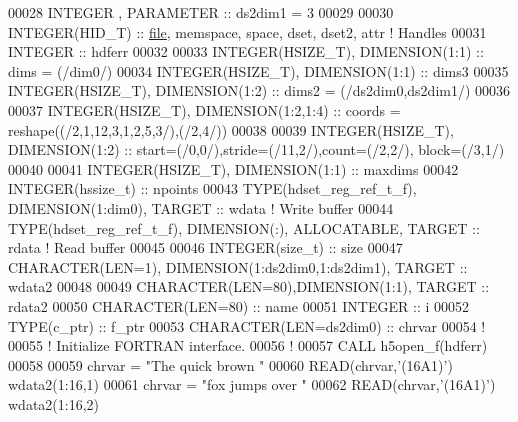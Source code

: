 \begin{DoxyCode}
00028   \textcolor{keywordtype}{INTEGER}          , \textcolor{keywordtype}{PARAMETER} :: ds2dim1   = 3
00029 
00030   \textcolor{keywordtype}{INTEGER(HID\_T)}  :: \hyperlink{structfile}{file}, memspace, space, dset, dset2, attr \textcolor{comment}{! Handles}
00031   \textcolor{keywordtype}{INTEGER} :: hdferr
00032 
00033   \textcolor{keywordtype}{INTEGER(HSIZE\_T)}, \textcolor{keywordtype}{DIMENSION(1:1)}   :: dims = (/dim0/)
00034   \textcolor{keywordtype}{INTEGER(HSIZE\_T)}, \textcolor{keywordtype}{DIMENSION(1:1)}   :: dims3 
00035   \textcolor{keywordtype}{INTEGER(HSIZE\_T)}, \textcolor{keywordtype}{DIMENSION(1:2)}   :: dims2 = (/ds2dim0,ds2dim1/)
00036 
00037   \textcolor{keywordtype}{INTEGER(HSIZE\_T)}, \textcolor{keywordtype}{DIMENSION(1:2,1:4)} :: coords = reshape((/2,1,12,3,1,2,5,3/),(/2,4/))
00038   
00039   \textcolor{keywordtype}{INTEGER(HSIZE\_T)}, \textcolor{keywordtype}{DIMENSION(1:2)} :: start=(/0,0/),stride=(/11,2/),count=(/2,2/), block=(/3,1/)
00040 
00041   \textcolor{keywordtype}{INTEGER(HSIZE\_T)}, \textcolor{keywordtype}{DIMENSION(1:1)} :: maxdims
00042   \textcolor{keywordtype}{INTEGER(hssize\_t)} :: npoints
00043   \textcolor{keywordtype}{TYPE}(hdset\_reg\_ref\_t\_f), \textcolor{keywordtype}{DIMENSION(1:dim0)}, \textcolor{keywordtype}{TARGET} :: wdata  \textcolor{comment}{! Write buffer}
00044   \textcolor{keywordtype}{TYPE}(hdset\_reg\_ref\_t\_f), \textcolor{keywordtype}{DIMENSION(:)}, \textcolor{keywordtype}{ALLOCATABLE}, \textcolor{keywordtype}{TARGET} :: rdata \textcolor{comment}{! Read buffer}
00045 
00046   \textcolor{keywordtype}{INTEGER(size\_t)} :: size
00047   \textcolor{keywordtype}{CHARACTER(LEN=1)}, \textcolor{keywordtype}{DIMENSION(1:ds2dim0,1:ds2dim1)}, \textcolor{keywordtype}{TARGET} :: wdata2
00048 
00049   \textcolor{keywordtype}{CHARACTER(LEN=80)},\textcolor{keywordtype}{DIMENSION(1:1)}, \textcolor{keywordtype}{TARGET} :: rdata2
00050   \textcolor{keywordtype}{CHARACTER(LEN=80)} :: name
00051   \textcolor{keywordtype}{INTEGER} :: i
00052   \textcolor{keywordtype}{TYPE}(c\_ptr) :: f\_ptr
00053   \textcolor{keywordtype}{CHARACTER(LEN=ds2dim0)} :: chrvar
00054   \textcolor{comment}{!}
00055   \textcolor{comment}{! Initialize FORTRAN interface.}
00056   \textcolor{comment}{!}
00057   \textcolor{keyword}{CALL }h5open\_f(hdferr)
00058 
00059   chrvar = \textcolor{stringliteral}{"The quick brown "}
00060   \textcolor{keyword}{READ}(chrvar,\textcolor{stringliteral}{'(16A1)'}) wdata2(1:16,1)
00061   chrvar = \textcolor{stringliteral}{"fox jumps over  "}
00062   \textcolor{keyword}{READ}(chrvar,\textcolor{stringliteral}{'(16A1)'}) wdata2(1:16,2)

\end{DoxyCode}
